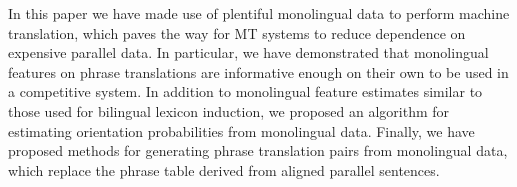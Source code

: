 \documentclass[11pt]{article}
\newcommand{\secref}[1]{Section~\ref{#1}}
\begin{document}
In this paper we have made use of plentiful monolingual data to perform machine translation, which paves the way for MT systems to reduce dependence on expensive parallel data.  In particular, we have demonstrated that monolingual features on phrase translations are informative enough on their own to be used in a competitive system. In addition to monolingual feature estimates similar to those used for bilingual lexicon induction, we proposed an algorithm for estimating orientation probabilities from monolingual data. Finally, we have proposed methods for generating phrase translation pairs from monolingual data, which replace the phrase table derived from aligned parallel sentences.





\newpage


\end{document}
